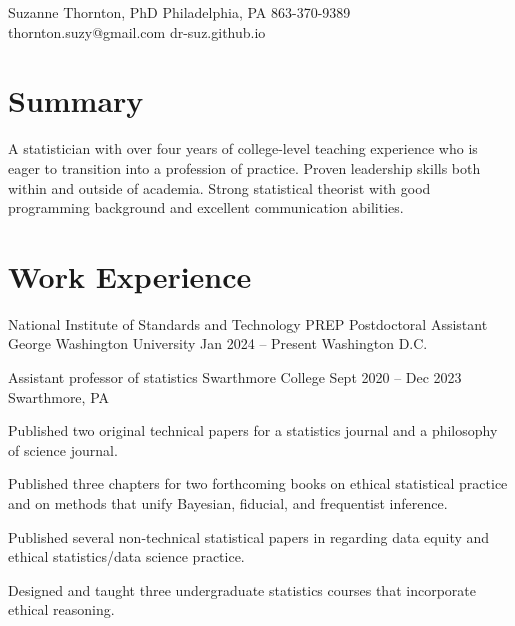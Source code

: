 \documentclass[letterpaper]{resume_config}
\begin{document}
\Header
    {Suzanne Thornton, PhD} %
    {Philadelphia, PA} %
    {863-370-9389} %
    {thornton.suzy@gmail.com} %
    {dr-suz.github.io} %

\section{Summary}
A statistician with over four years of college-level teaching experience who is eager to transition into a profession of practice. Proven leadership skills both within and outside of academia. Strong statistical theorist with good programming background and excellent communication abilities. 


\section{Work Experience}
\WorkExperience
    {National Institute of Standards and Technology PREP Postdoctoral Assistant} %
    {George Washington University} %
    {Jan 2024 -- Present} %
    {Washington D.C.} %
    {
        \item 
    } 

\WorkExperience
    {Assistant professor of statistics} %
    {Swarthmore College} %
    {Sept 2020 -- Dec 2023} %
    {Swarthmore, PA} %
    {
        \item Published two original technical papers for a statistics journal and a philosophy of science journal. 
        \item Published three chapters for two forthcoming books on ethical statistical practice and on methods that unify Bayesian, fiducial, and frequentist inference. 
        \item Published several non-technical statistical papers in regarding data equity and ethical statistics/data science practice. 
        \item Designed and taught three undergraduate statistics courses that incorporate ethical reasoning. 
    } 
\end{document}
